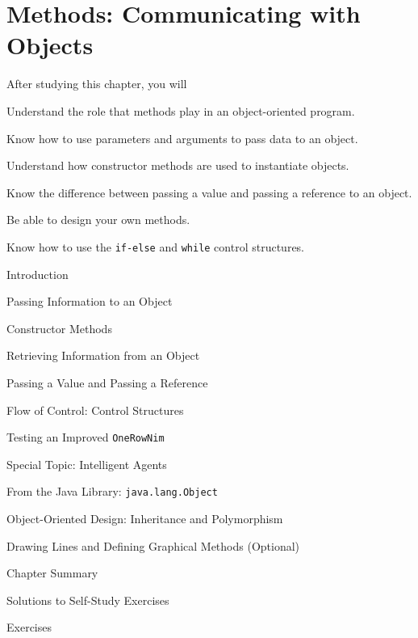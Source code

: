 
\setcounter{chapter}{2}
\setcounter{SSTUDYcount}{1}
\chapter{Methods: Communicating with Objects}
\label{chapter-methods}


\CObegin
{}
\noindent After studying this chapter, you will

\begin{COBL}
\item  Understand the role that methods play in an
  object-oriented program.
\item  Know how to use parameters and arguments to pass data to an object.
\item  Understand how constructor methods are used to instantiate objects.

\item  Know the difference between passing a value and passing a reference
   to an object.
\item  Be able to design your own methods.
\item  Know how to use the {\tt if-else} and {\tt while} control structures.
\end{COBL}

\begin{COL}
\item Introduction
\item Passing Information to an Object
\item Constructor Methods
\item Retrieving Information from an Object
\item Passing a Value and Passing a Reference
\item Flow of Control: Control Structures
\item Testing an Improved {\tt OneRowNim}
\item[] {{\color{cyan}Special Topic:} Intelligent Agents}
\item From the Java Library: {\tt java.lang.Object}
\item Object-Oriented Design: Inheritance and Polymorphism
\item Drawing Lines and Defining Graphical Methods (Optional)
\par\small\item[] Chapter Summary
\par\small\item[] Solutions to Self-Study Exercises
\par\small\item[] Exercises
\end{COL}
\COend

